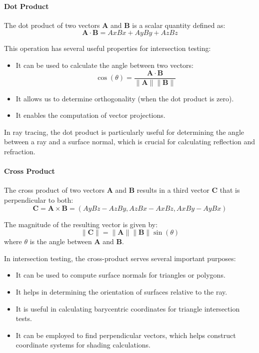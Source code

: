 \documentclass[12pt]{article}
\begin{document}
\paragraph{Dot Product}
The dot product of two vectors \(\mathbf{A}\) and \(\mathbf{B}\) is a scalar quantity defined as:
\[
    \mathbf{A} \cdot \mathbf{B} = Ax Bx + Ay By + Az Bz
\]

This operation has several useful properties for intersection testing:

\begin{itemize}
    \item It can be used to calculate the angle between two vectors:
          \[
              \cos(\theta) = \frac{\mathbf{A} \cdot \mathbf{B}}{\|\mathbf{A}\| \|\mathbf{B}\|}
          \]
    \item It allows us to determine orthogonality (when the dot product is zero).
    \item It enables the computation of vector projections.
\end{itemize}

In ray tracing, the dot product is particularly useful for determining the angle between a ray and a surface normal, which is crucial for calculating reflection and refraction.

\paragraph{Cross Product}
The cross product of two vectors \(\mathbf{A}\) and \(\mathbf{B}\) results in a third vector \(\mathbf{C}\) that is perpendicular to both:
\[
    \mathbf{C} = \mathbf{A} \times \mathbf{B} = \left( Ay Bz - Az By, Az Bx - Ax Bz, Ax By - Ay Bx \right)
\]

The magnitude of the resulting vector is given by:
\[
    \|\mathbf{C}\| = \|\mathbf{A}\| \|\mathbf{B}\| \sin(\theta)
\]
where \(\theta\) is the angle between \(\mathbf{A}\) and \(\mathbf{B}\).

In intersection testing, the cross-product serves several important purposes:

\begin{itemize}
    \item It can be used to compute surface normals for triangles or polygons.
    \item It helps in determining the orientation of surfaces relative to the ray.
    \item It is useful in calculating barycentric coordinates for triangle intersection tests.
    \item It can be employed to find perpendicular vectors, which helps construct coordinate systems for shading calculations.
\end{itemize}
\end{document}
